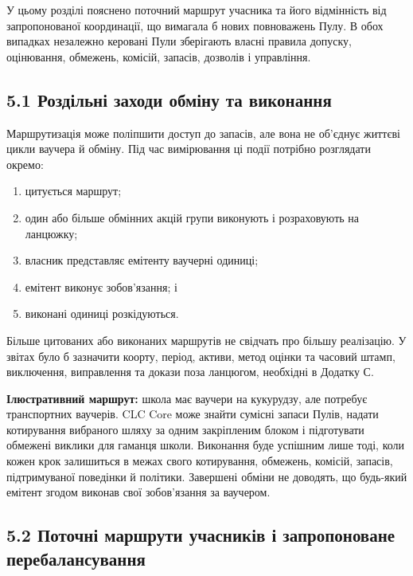\documentclass[11pt]{article}
\begin{document}
У цьому розділі пояснено поточний маршрут учасника та його відмінність від запропонованої координації, що вимагала б нових повноважень Пулу. В обох випадках незалежно керовані Пули зберігають власні правила допуску, оцінювання, обмежень, комісій, запасів, дозволів і управління.

\subsection*{5.1 Роздільні заходи обміну та виконання}

Маршрутизація може поліпшити доступ до запасів, але вона не об'єднує життєві цикли ваучера й обміну. Під час вимірювання ці події потрібно розглядати окремо:

\begin{enumerate}[leftmargin=*]
\item цитується маршрут;
\item один або більше обмінних акцій групи виконують і розраховують на ланцюжку;
\item власник представляє емітенту ваучерні одиниці;
\item емітент виконує зобов'язання; і
\item виконані одиниці розкідуються.
\end{enumerate}
Більше цитованих або виконаних маршрутів не свідчать про більшу реалізацію. У звітах було б зазначити коорту, період, активи, метод оцінки та часовий штамп, виключення, виправлення та докази поза ланцюгом, необхідні в Додатку С.

\textbf{Ілюстративний маршрут:} школа має ваучери на кукурудзу, але потребує транспортних ваучерів. CLC Core може знайти сумісні запаси Пулів, надати котирування вибраного шляху за одним закріпленим блоком і підготувати обмежені виклики для гаманця школи. Виконання буде успішним лише тоді, коли кожен крок залишиться в межах свого котирування, обмежень, комісій, запасів, підтримуваної поведінки й політики. Завершені обміни не доводять, що будь-який емітент згодом виконав свої зобов'язання за ваучером.

\subsection*{5.2 Поточні маршрути учасників і запропоноване перебалансування}
\end{document}
